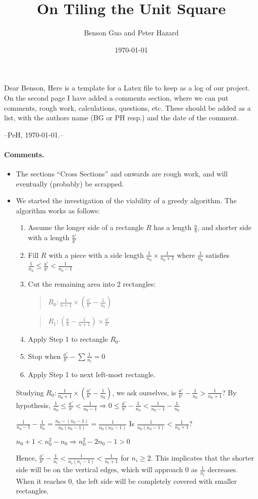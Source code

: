 \documentclass[11pt]{article}
\title{On Tiling the Unit Square}
\author{Benson Guo and Peter Hazard}
\date{\today}
\theoremstyle{plain}%
\theoremstyle{definition}
\theoremstyle{remark}
\numberwithin{equation}{section}
\begin{document}
\pagestyle{empty}
\noindent
Dear Benson,
\vskip 10pt
Here is a template for a Latex file to keep as a log of our project.
On the second page I have added a comments section, where we can put comments, rough work, calculations, questions, etc.
These should be added as a list, with the authors name (BG or PH resp.) and the date of the comment.
\vskip 50pt

{\flushright --PeH, \today.--}
\newpage

\paragraph{Comments.}
\begin{itemize}
\item[PH -- 2015/02/01]
The sections ``Cross Sections'' and onwards are rough work, and will eventually (probably) be scrapped.
\end{itemize}
\begin{itemize}
\item[BG -- 2015/02/07]
We started the investigation of the viability of a greedy algorithm.
The algorithm works as follows:
\begin{enumerate}
\item Assume the longer side of a rectangle $R$ has a length $\frac{a}{b}$, and shorter side with a length $\frac{a\prime}{b\prime}$
\item Fill $R$ with a piece with a side length $\frac{1}{n_{0}}\times\frac{1}{n_{0}+1}  $ where $\frac{1}{n_0}$ satisfies $\frac{1}{n_0}\le\frac{a\prime}{b\prime}<\frac{1}{n_{0}-1}$
\item Cut the remaining area into 2 rectangles:
\begin{quote}
$R_0: \frac{1}{n+1}\times(\frac{a\prime}{b\prime}-\frac{1}{n_0})  $
\end{quote} 
\begin{quote}
$R_1: (\frac{a}{b}-\frac{1}{n+1})\times \frac{a\prime}{b\prime} $
\end{quote} 
\item Apply Step 1 to rectangle $R_0$.
\item Stop when $\frac{a\prime}{b\prime} - \sum \frac{1}{n_i}=0$
\item Apply Step 1 to next left-most rectangle.
\end{enumerate}
Studying  $R_0: \frac{1}{n_0+1}\times(\frac{a\prime}{b\prime}-\frac{1}{n_0})  $, we ask ourselves, is $\frac{a\prime}{b\prime}-\frac{1}{n_0}>\frac{1}{n_0+1}$?
By hypothesis, $\frac{1}{n_0}\le\frac{a\prime}{b\prime}<\frac{1}{n_{0}-1} \Rightarrow 0\le\frac{a\prime}{b\prime}-\frac{1}{n_0}<\frac{1}{n_0-1}-\frac{1}{n_0}$

$\frac{1}{n_0-1}-\frac{1}{n_0}=\frac{n_0-(n_0-1)}{n_0(n_0-1)}=\frac{1}{n_0(n_0-1)}$
Is $\frac{1}{n_0(n_0-1)}<\frac{1}{n_0+1}$?

$n_0+1<n_0^2-n_0\Rightarrow n_0^{2}-2n_0-1>0$

Hence, $\frac{a\prime}{b\prime}-\frac{1}{n_i}<\frac{1}{n_i(n_i-1)}<\frac{1}{n_i+1}$ for $n_i\ge2$.
This implicates that the shorter side will be on the vertical edges, which will approach $0$ as $\frac{1}{n_i}$ decreases. When it reaches $0$, the left side will be completely covered with smaller rectangles. 
\end{itemize}
\end{document}
